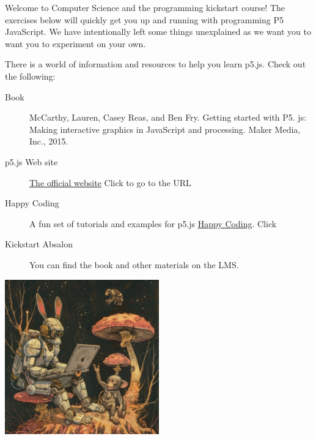 \documentclass{ucph-handout}
\begin{document}
\begin{exercisebox}[adjusted title=Welcome to Kickstart]
Welcome to Computer Science and the programming kickstart course!
The exercises below will quickly get you up and running with programming P5 JavaScript. We have intentionally left some things unexplained as we want you to want you to experiment on your own.
\end{exercisebox}

\begin{exercisebox}[adjusted title=Resources]
There is a world of information and resources to help you learn p5.js. Check out the following:
\begin{description}
\item[ Book]  McCarthy, Lauren, Casey Reas, and Ben Fry. Getting started with P5. js: Making interactive graphics in JavaScript and processing. Maker Media, Inc., 2015.
\item[p5.js Web site] \href{https://p5js.org/}{The official website} Click to go to the URL
\item[Happy Coding] A fun set of tutorials and examples for p5.js \href{https://happycoding.io/}{Happy Coding}. Click
\item[Kickstart Absalon] You can find the book and other materials on the LMS.
\end{description}
\end{exercisebox}

\begin{exercisebox}[adjusted title=Have Fun]
\begin{center}
\includegraphics[width=0.5\textwidth]{illustrationer/monkey_fun.png}
\end{center}

\end{exercisebox}














\end{document}
